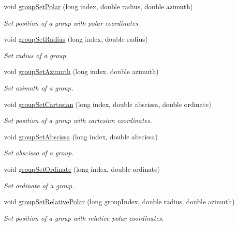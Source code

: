 \begin{DoxyCompactItemize}
void \hyperlink{class_hoa2_d_1_1_sources_manager_aec40263d130e2ad357ec7ff02a2e8da7}{group\-Set\-Polar} (long index, double radius, double azimuth)
\begin{DoxyCompactList}\small\item\em Set position of a group with polar coordinates. \end{DoxyCompactList}\item 
void \hyperlink{class_hoa2_d_1_1_sources_manager_a5d3e3434c86aa7557724c4e75ba0f956}{group\-Set\-Radius} (long index, double radius)
\begin{DoxyCompactList}\small\item\em Set radius of a group. \end{DoxyCompactList}\item 
void \hyperlink{class_hoa2_d_1_1_sources_manager_ae84c7e24c00eb680f2b489379de051ec}{group\-Set\-Azimuth} (long index, double azimuth)
\begin{DoxyCompactList}\small\item\em Set azimuth of a group. \end{DoxyCompactList}\item 
void \hyperlink{class_hoa2_d_1_1_sources_manager_a306a8591f385cedab2b73217476d5844}{group\-Set\-Cartesian} (long index, double abscissa, double ordinate)
\begin{DoxyCompactList}\small\item\em Set position of a group with cartesian coordinates. \end{DoxyCompactList}\item 
void \hyperlink{class_hoa2_d_1_1_sources_manager_a712b453739383b3dba75c1d3787031dd}{group\-Set\-Abscissa} (long index, double abscissa)
\begin{DoxyCompactList}\small\item\em Set abscissa of a group. \end{DoxyCompactList}\item 
void \hyperlink{class_hoa2_d_1_1_sources_manager_a3e65297365b2cd55f35e1a0b9613cb8a}{group\-Set\-Ordinate} (long index, double ordinate)
\begin{DoxyCompactList}\small\item\em Set ordinate of a group. \end{DoxyCompactList}\item 
void \hyperlink{class_hoa2_d_1_1_sources_manager_a3ec1abdf99fe048a34270225e6f3f01d}{group\-Set\-Relative\-Polar} (long group\-Index, double radius, double azimuth)
\begin{DoxyCompactList}\small\item\em Set position of a group with relative polar coordinates. \end{DoxyCompactList}\item 

\end{DoxyCompactItemize}
